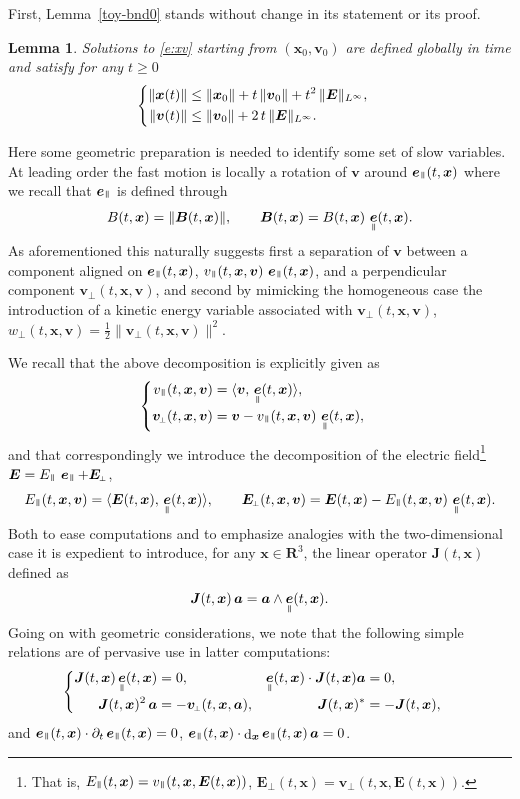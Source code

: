 \documentclass[10pt]{amsart}
\newenvironment{splitcases}
{\begin{cases}\begin{aligned}}
{\end{aligned}\end{cases}}
\newcommand{\sperp}{{\scriptscriptstyle\perp}}
\let\d\partial
\DeclareMathOperator\dD{d}\let\dd\dD
\theoremstyle{plain}
\newtheorem{lemma}[theorem]{Lemma}
\theoremstyle{definition}
\newcommand{\be}{\begin{equation}}
\newcommand{\ee}{\end{equation}}
\newcommand{\bl}{\begin{lemma}}
\newcommand{\el}{\end{lemma}}
\newcommand\R{\mathbf R}
\newcommand\bB{{\boldsymbol B}}
\newcommand\bE{{\boldsymbol E}}
\newcommand\bJ{{\boldsymbol J}}
\newcommand\bfa{{\boldsymbol a}}
\newcommand\bfv{{\boldsymbol v}}
\newcommand\bfx{{\boldsymbol x}}
\DeclareMathOperator{\beD}{\boldsymbol{e}}
\newcommand\eDpar{\beD_\mypar}
\newcommand\vpar{v_\mypar}
\newcommand\bvperp{\bfv_{\!\sperp}}
\newcommand\eperp{w_{\!\sperp}}
\newcommand\Epar{E_\mypar}
\newcommand\Eperp{\bE_{\!\sperp}}
\newcommand{\mypar}{{\mkern3mu\vphantom{\perp}\vrule depth 0pt\mkern2mu\vrule depth 0pt\mkern3mu}}
\begin{document}
First, Lemma~\ref{toy-bnd0} stands without change in its statement or its proof.

\bl\label{bnd0}
Solutions to \eqref{e:xv} starting from $(\bfx_0,\bfv_0)$ are defined
globally in time and satisfy for any $t\geq0$
\[
\begin{splitcases}
\|\bfx(t)\|&\leq \|\bfx_0\|
+t\,\|\bfv_0\|+t^2\,\|\bE\|_{L^\infty},
\\
\|\bfv(t)\| &\leq \|\bfv_0\|+2\,t\,\|\bE\|_{L^\infty}.
\end{splitcases}
\]
\el

Here some geometric preparation is needed to identify some set of slow variables. At leading order the fast motion is locally a rotation of $\bfv$ around $\eDpar(t,\bfx)$ where we recall that $\eDpar$ is defined through
\[
B(t,\bfx)=\|\bB(t,\bfx)\|,\qquad \bB(t,\bfx)=B(t,\bfx)\,\eDpar(t,\bfx).
\]
As aforementioned this naturally suggests first a separation of $\bfv$ between a component aligned on $\eDpar(t,\bfx)$, $\vpar(t,\bfx,\bfv)\,\eDpar(t,\bfx)$, and a perpendicular component $\bvperp(t,\bfx,\bfv)$, and second by mimicking the homogeneous case the introduction of a kinetic energy variable associated with $\bvperp(t,\bfx,\bfv)$, $\eperp(t,\bfx,\bfv)=\tfrac12\|\bvperp(t,\bfx,\bfv)\|^2$.

We recall that the above decomposition is explicitly given as
\[
\begin{splitcases}
\vpar(t,\bfx,\bfv) &=\langle\bfv,\,\eDpar(t,\bfx)\rangle,
\\
\bvperp(t,\bfx,\bfv)&=\bfv-\vpar(t,\bfx,\bfv)\,\eDpar(t,\bfx),
\end{splitcases}
\]
and that correspondingly we introduce the decomposition of the electric field\footnote{That is, $\Epar(t,\bfx)=\vpar(t,\bfx,\bE(t,\bfx))$, $\Eperp(t,\bfx)=\bvperp(t,\bfx,\bE(t,\bfx))$.} $\bE=\Epar\,\eDpar+\Eperp$,
\[
\Epar(t,\bfx,\bfv)=\langle\bE(t,\bfx),\,\eDpar(t,\bfx)\rangle,\qquad
\Eperp(t,\bfx,\bfv)=\bE(t,\bfx)-\Epar(t,\bfx,\bfv)\,\eDpar(t,\bfx).
\]
Both to ease computations and to emphasize analogies with the two-dimensional case it is expedient to introduce, for any $\bfx\in\R^3$, the linear operator $\bJ(t,\bfx)$ defined as
\[
\bJ(t,\bfx) \,\bfa= \bfa\wedge \eDpar(t,\bfx).
\]
Going on with geometric considerations, we note that the following simple relations are of pervasive use in latter computations:
\be\label{e:J}
\begin{splitcases}
\bJ(t,\bfx)\eDpar(t,\bfx)&=0,&
\eDpar(t,\bfx)\cdot\bJ(t,\bfx)\bfa&=0,
\\
\bJ(t,\bfx)^2\,\bfa&=-\bvperp(t,\bfx,\bfa),&
\bJ(t,\bfx)^*&=-\bJ(t,\bfx),
\end{splitcases}
\ee
and $\eDpar(t,\bfx)\cdot\d_t\eDpar(t,\bfx)=0$, $\eDpar(t,\bfx)\cdot\dD_\bfx\eDpar(t,\bfx)\,\bfa=0$.
\end{document}
